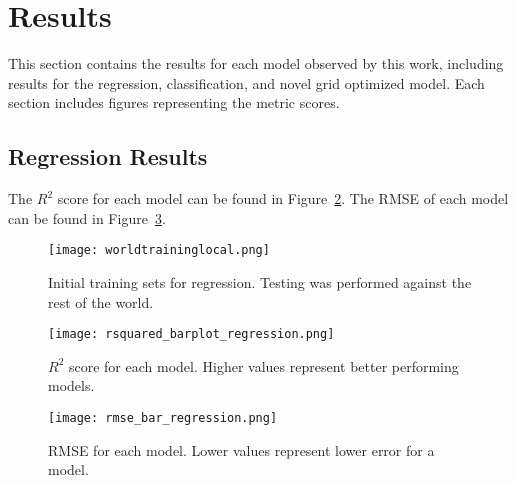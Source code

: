 \section{Results}
\label{sec:results}
\setlength{\parindent}{10ex}

This section contains the results for each model observed by this work, including results for the regression, classification, and novel grid optimized model.
Each section includes figures representing the metric scores.

\subsection{Regression Results}
The \(R^2\) score for each model can be found in Figure~\ref{fig:r2_barplot_regression}.
The RMSE of each model can be found in Figure~\ref{fig:rmse_barplot_regression}.



\begin{figure}[htp]
    \centering
    \texttt{[image: worldtraininglocal.png]}
    \caption[Figure depicting regression training sets]{Initial training sets for regression. Testing was performed against the rest of the world.}
    \label{fig:trainset}
\end{figure}


\begin{figure}[htp]
    \centering
    \texttt{[image: rsquared\_barplot\_regression.png]}
    \caption[Graphs depicting regression \(R^2\) results]{\(R^2\) score for each model. Higher values represent better performing models.}
    \label{fig:r2_barplot_regression}
\end{figure}

\begin{figure}[htp]
    \centering
    \texttt{[image: rmse\_bar\_regression.png]} 
    \caption[Graphs depicting regression RMSE results]{RMSE for each model. Lower values represent lower error for a model.}
    \label{fig:rmse_barplot_regression}
\end{figure}


